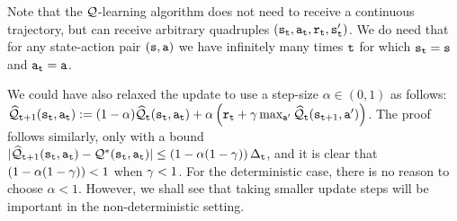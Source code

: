 \begin{remark}
Note that the $\mathcal{Q}$-learning algorithm does not need to receive a continuous trajectory, but can receive arbitrary quadruples
$({\tt s}_{\tt t},{\tt a}_{\tt t},{\tt r}_{\tt t},{\tt s}_{{\tt t}}')$. We do need that for any state-action pair $({\tt s},{\tt a})$ we have infinitely many times ${\tt t}$ for which ${\tt s}_{\tt t}={\tt s}$ and ${\tt a}_{\tt t}={\tt a}$.
\end{remark}

\begin{remark}\label{remark:modelfree_Q_learning_step}
We could have also relaxed the update to use a step-size $\alpha\in (0,1)$ as follows: $\widehat{\mathcal{Q}}_{{\tt t}+1}({\tt s}_{\tt t},{\tt a}_{\tt t}) := (1-\alpha) \widehat{\mathcal{Q}}_{{\tt t}}({\tt s}_{\tt t},{\tt a}_{\tt t}) + \alpha \left(
{\tt r}_{\tt t}+\gamma \max_{{\tt a}'}
\widehat{\mathcal{Q}}_{\tt t}({\tt s}_{{\tt t}+1},{\tt a}')\right)$. The proof follows similarly, only with a bound $| \widehat{\mathcal{Q}}_{{\tt t}+1}({\tt s}_{\tt t},{\tt a}_{\tt t})-
\mathcal{Q}^*({\tt s}_{\tt t},{\tt a}_{\tt t})| \leq \left( 1 - \alpha(1 - \gamma)\right) \Delta_{\tt t}$, and it is clear that $\left( 1 - \alpha(1 - \gamma)\right)<1$ when $\gamma<1$. For the deterministic case, there is no reason to choose $\alpha<1$. However, we shall see that taking smaller update steps will be important in the non-deterministic setting.
\end{remark}

